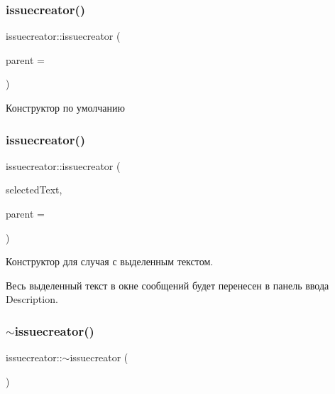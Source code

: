 \subsubsection{\texorpdfstring{issuecreator()}{issuecreator()}\hspace{0.1cm}{\footnotesize\ttfamily [1/2]}}
{\footnotesize\ttfamily issuecreator\+::issuecreator (\begin{DoxyParamCaption}\item[{Q\+Widget $\ast$}]{parent = {} }\end{DoxyParamCaption})\hspace{0.3cm}{\ttfamily [explicit]}}



Конструктор по умолчанию 

\mbox{\label{classissuecreator_ae623be0a0b031f1382b844133e51e1cb}} 
\subsubsection{\texorpdfstring{issuecreator()}{issuecreator()}\hspace{0.1cm}{\footnotesize\ttfamily [2/2]}}
{\footnotesize\ttfamily issuecreator\+::issuecreator (\begin{DoxyParamCaption}\item[{const Q\+String \&}]{selected\+Text,  }\item[{Q\+Widget $\ast$}]{parent = {} }\end{DoxyParamCaption})}



Конструктор для случая с выделенным текстом. 

Весь выделенный текст в окне сообщений будет перенесен в панель ввода Description. \mbox{\label{classissuecreator_ac3f6c719cc0c836d709f92a166f5ee30}} 
\subsubsection{\texorpdfstring{$\sim$issuecreator()}{~issuecreator()}}
{\footnotesize\ttfamily issuecreator\+::$\sim$issuecreator (\begin{DoxyParamCaption}{ }\end{DoxyParamCaption})}



